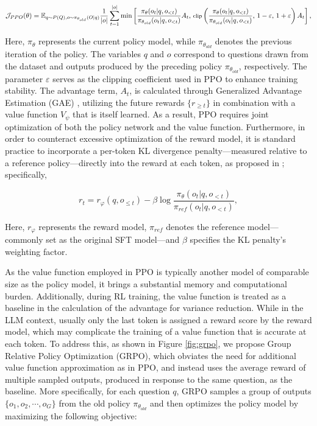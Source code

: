 \begin{itemize}[topsep=0pt]
\begin{itemize}[topsep=0pt]
\begin{equation}
\footnotesize
    \mathcal{J}_{PPO}(\theta) = \mathbb{E}_{q \sim P(Q), o \sim \pi_{\theta_{old}}(O|q)} \frac{1}{|o|} \sum_{t=1}^{|o|} \min \left[ \frac{\pi_\theta(o_{t} | q, o_{<t})}{\pi_{\theta_{old}}(o_{t} | q, o_{<t})} A_{t},\, \text{clip} \left( \frac{\pi_\theta(o_{t} | q, o_{<t})}{\pi_{\theta_{old}}(o_{t} | q, o_{<t})},\, 1 - \varepsilon,\, 1 + \varepsilon \right)  A_{t} \right] ,
\end{equation}

Here, $\pi_{\theta}$ represents the current policy model, while $\pi_{\theta_{old}}$ denotes the previous iteration of the policy. The variables $q$ and $o$ correspond to questions drawn from the dataset and outputs produced by the preceding policy $\pi_{\theta_{old}}$, respectively. The parameter $\varepsilon$ serves as the clipping coefficient used in PPO to enhance training stability. The advantage term, $A_t$, is calculated through Generalized Advantage Estimation (GAE) \citep{gae}, utilizing the future rewards $\{r_{\ge t}\}$ in combination with a value function $V_{\psi}$ that is itself learned. As a result, PPO requires joint optimization of both the policy network and the value function. Furthermore, in order to counteract excessive optimization of the reward model, it is standard practice to incorporate a per-token KL divergence penalty—measured relative to a reference policy—directly into the reward at each token, as proposed in \citep{ouyang2022training}; specifically,

\begin{equation}
    r_{t} = r_\varphi(q, o_{\le t}) - \beta \log\frac{\pi_{\theta}(o_{t}|q, o_{<t})}{\pi_{ref}(o_{t}|q, o_{<t})},
\label{eq:PPO-reward}
\end{equation}

Here, $r_\varphi$ represents the reward model, $\pi_{ref}$ denotes the reference model—commonly set as the original SFT model—and $\beta$ specifies the KL penalty’s weighting factor.

As the value function employed in PPO is typically another model of comparable size as the policy model, it brings a substantial memory and computational burden. Additionally, during RL training, the value function is treated as a baseline in the calculation of the advantage for variance reduction. While in the LLM context, usually only the last token is assigned a reward score by the reward model, which may complicate the training of a value function that is accurate at each token. To address this, as shown in Figure \ref{fig:grpo}, we propose Group Relative Policy Optimization (GRPO), which obviates the need for additional value function approximation as in PPO, and instead uses the average reward of multiple sampled outputs, produced in response to the same question, as the baseline. More specifically, for each question $q$, GRPO samples a group of outputs $\{o_1, o_2, \cdots, o_G\}$  from the old policy  $\pi_{\theta_{old}}$  and then optimizes the policy model by maximizing the following objective:


\end{itemize}
\end{itemize}
